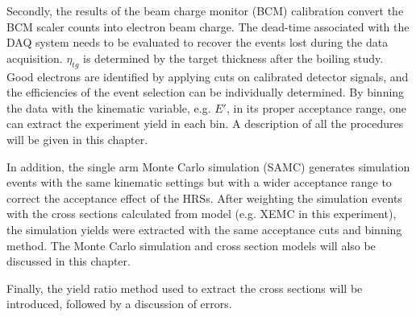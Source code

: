 \documentclass[a4paper,10.5pt]{article}
\begin{document}
 Secondly, the results of the beam charge monitor (BCM) calibration convert the BCM scaler counts into electron beam charge. The dead-time associated with the DAQ system needs to be evaluated to recover the events lost during the data acquisition. $\eta_{tg}$ is determined by the target thickness after the boiling study. Good electrons are identified by applying cuts on calibrated detector signals, and the efficiencies of the event selection can be individually determined. By binning the data with the kinematic variable, e.g. $E'$, in its proper acceptance range, one can extract the experiment yield in each bin. A description of all the procedures will be given in this chapter.
 
 In addition, the single arm Monte Carlo simulation (SAMC) generates simulation events with the same kinematic settings but with a wider acceptance range to correct the acceptance effect of the HRSs. After weighting the simulation events with the cross sections calculated from model (e.g. XEMC in this experiment), the simulation yields were extracted with the same acceptance cuts and binning method. The Monte Carlo simulation and cross section models will also be discussed in this chapter.

 Finally, the yield ratio method used to extract the cross sections will be introduced, followed by a discussion of errors.















\renewcommand{\baselinestretch}{1}\normalsize

%

\end{document}
